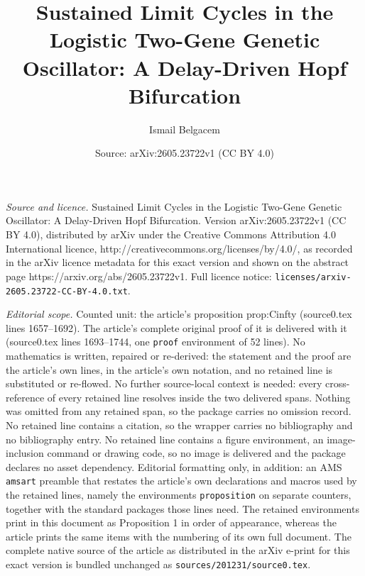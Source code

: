 \documentclass[10pt,a4paper]{amsart}
\title{Sustained Limit Cycles in the Logistic Two-Gene Genetic Oscillator: A Delay-Driven Hopf Bifurcation}
\author{Ismail Belgacem}
\date{Source: arXiv:2605.23722v1 (CC BY 4.0)}
\begin{document}
\maketitle

\noindent\emph{Source and licence.} Sustained Limit Cycles in the Logistic Two-Gene Genetic Oscillator: A Delay-Driven Hopf Bifurcation. Version arXiv:2605.23722v1 (CC BY 4.0), distributed by arXiv under the Creative Commons Attribution 4.0 International licence, http://creativecommons.org/licenses/by/4.0/, as recorded in the arXiv licence metadata for this exact version and shown on the abstract page https://arxiv.org/abs/2605.23722v1. Full licence notice: \texttt{licenses/arxiv-2605.23722-CC-BY-4.0.txt}.\par\smallskip

\noindent\textit{Editorial scope.} Counted unit: the article's proposition prop:Cinfty (source0.tex lines 1657--1692). The article's complete original proof of it is delivered with it (source0.tex lines 1693--1744, one \texttt{proof} environment of 52 lines). No mathematics is written, repaired or re-derived: the statement and the proof are the article's own lines, in the article's own notation, and no retained line is substituted or re-flowed.  No further source-local context is needed: every cross-reference of every retained line resolves inside the two delivered spans.  Nothing was omitted from any retained span, so the package carries no omission record.  No retained line contains a citation, so the wrapper carries no bibliography and no bibliography entry.  No retained line contains a figure environment, an image-inclusion command or drawing code, so no image is delivered and the package declares no asset dependency.  Editorial formatting only, in addition: an AMS \texttt{amsart} preamble that restates the article's own declarations and macros used by the retained lines, namely the environments \texttt{proposition} on separate counters, together with the standard packages those lines need.  The retained environments print in this document as Proposition 1 in order of appearance, whereas the article prints the same items with the numbering of its own full document.  The complete native source of the article as distributed in the arXiv e-print for this exact version is bundled unchanged as \texttt{sources/201231/source0.tex}.
\end{document}
